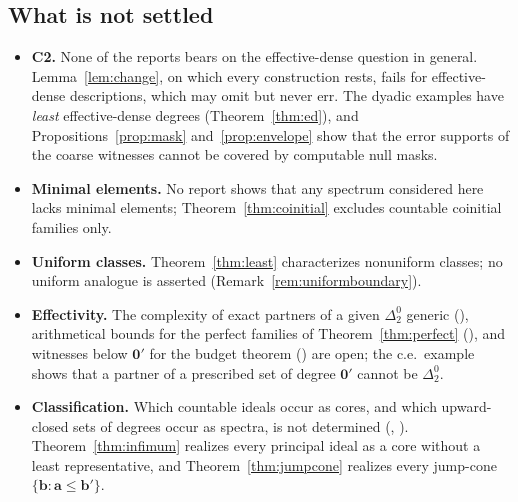 \documentclass[11pt,letterpaper]{article}
\theoremstyle{definition}
\numberwithin{equation}{section}
\newcommand{\zero}{\mathbf 0}
\newcommand{\rep}[1]{\leavevmode{\sffamily\small\color{Steel}R#1}}
\begin{document}
\subsection{What is not settled}
\begin{itemize}
\item \textbf{C2.} None of the reports bears on the effective-dense question in general. Lemma~\ref{lem:change}, on which every construction rests, fails for effective-dense descriptions, which may omit but never err. The dyadic examples have \emph{least} effective-dense degrees (Theorem~\ref{thm:ed}), and Propositions~\ref{prop:mask} and~\ref{prop:envelope} show that the error supports of the coarse witnesses cannot be covered by computable null masks.
\item \textbf{Minimal elements.} No report shows that any spectrum considered here lacks minimal elements; Theorem~\ref{thm:coinitial} excludes countable coinitial families only.
\item \textbf{Uniform classes.} Theorem~\ref{thm:least} characterizes nonuniform classes; no uniform analogue is asserted (Remark~\ref{rem:uniformboundary}).
\item \textbf{Effectivity.} The complexity of exact partners of a given $\Delta^0_2$ generic (\rep1), arithmetical bounds for the perfect families of Theorem~\ref{thm:perfect} (\rep9), and witnesses below $\zero'$ for the budget theorem (\rep6) are open; the c.e.\ example shows that a partner of a prescribed set of degree $\zero'$ cannot be $\Delta^0_2$.
\item \textbf{Classification.} Which countable ideals occur as cores, and which upward-closed sets of degrees occur as spectra, is not determined (\rep2, \rep9). Theorem~\ref{thm:infimum} realizes every principal ideal as a core without a least representative, and Theorem~\ref{thm:jumpcone} realizes every jump-cone $\{\mathbf b:\mathbf a\le\mathbf b'\}$.

\end{itemize}
\end{document}
